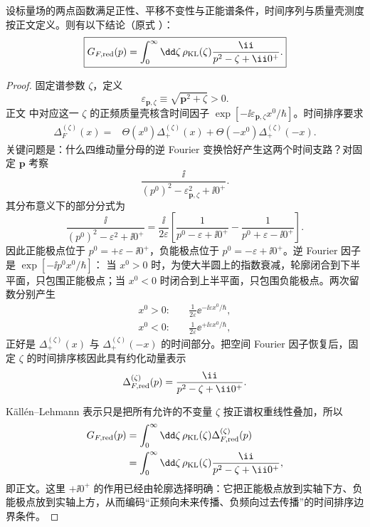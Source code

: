 \begin{proposition}[二点函数的正谱表示]
设标量场的两点函数满足正性、平移不变性与正能谱条件，时间序列与质量壳测度按正文定义。则有以下结论（原式 ）：
\begin{equation*}
 \boxed{
 G_{F,\rm red}(p)
 =\int_0^\infty\dd\zeta\,
 \rho_{\rm KL}(\zeta)
 \frac{\ii}{p^2-\zeta+\ii0^+}.}
\end{equation*}
\end{proposition}
\begin{proof}
固定谱参数 $\zeta$，定义
\[
 \varepsilon_{\mathbf p,\zeta}
 \equiv\sqrt{\mathbf p^2+\zeta}>0.
\]
正文 中对应这一 $\zeta$ 的正频质量壳核含时间因子
$\exp[-\ii\varepsilon_{\mathbf p,\zeta}x^0/\hbar]$。时间排序要求
\begin{align*}
 \Delta_F^{(\zeta)}(x)
 ={}&\Theta(x^0)\Delta_+^{(\zeta)}(x)
 +\Theta(-x^0)\Delta_+^{(\zeta)}(-x).
\end{align*}
关键问题是：什么四维动量分母的逆 Fourier 变换恰好产生这两个时间支路？对固定 $\mathbf p$ 考察
\begin{equation*}
 \frac{\ii}{(p^0)^2-\varepsilon_{\mathbf p,\zeta}^2+\ii0^+}.
\end{equation*}
其分布意义下的部分分式为
\begin{equation*}
 \frac{\ii}{(p^0)^2-\varepsilon^2+\ii0^+}
 =\frac{\ii}{2\varepsilon}
 \left[
 \frac1{p^0-\varepsilon+\ii0^+}
 -\frac1{p^0+\varepsilon-\ii0^+}
 \right].
\end{equation*}
因此正能极点位于 $p^0=+\varepsilon-\ii0^+$，负能极点位于
$p^0=-\varepsilon+\ii0^+$。逆 Fourier 因子是
$\exp[-\ii p^0x^0/\hbar]$：
当 $x^0>0$ 时，为使大半圆上的指数衰减，轮廓闭合到下半平面，只包围正能极点；当 $x^0<0$ 时闭合到上半平面，只包围负能极点。两次留数分别产生
\begin{align*}
 x^0>0:&\quad
 \frac{1}{2\varepsilon}
 \ee^{-\ii\varepsilon x^0/\hbar},\\
 x^0<0:&\quad
 \frac{1}{2\varepsilon}
 \ee^{+\ii\varepsilon x^0/\hbar},
\end{align*}
正好是 $\Delta_+^{(\zeta)}(x)$ 与
$\Delta_+^{(\zeta)}(-x)$ 的时间部分。把空间 Fourier 因子恢复后，固定 $\zeta$ 的时间排序核因此具有约化动量表示
\[
 \Delta_{F,\rm red}^{(\zeta)}(p)
 =\frac{\ii}{p^2-\zeta+\ii0^+}.
\]

K\"all\'en--Lehmann 表示只是把所有允许的不变量 $\zeta$ 按正谱权重线性叠加，所以
\begin{align*}
 G_{F,\rm red}(p)
 &=\int_0^\infty\dd\zeta\,
 \rho_{\rm KL}(\zeta)\Delta_{F,\rm red}^{(\zeta)}(p)\\
 &=\int_0^\infty\dd\zeta\,
 \rho_{\rm KL}(\zeta)
 \frac{\ii}{p^2-\zeta+\ii0^+},
\end{align*}
即正文。这里 $+\ii0^+$ 的作用已经由轮廓选择明确：它把正能极点放到实轴下方、负能极点放到实轴上方，从而编码“正频向未来传播、负频向过去传播”的时间排序边界条件。
\end{proof}

